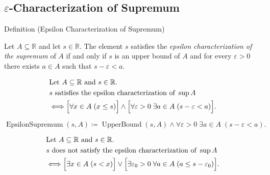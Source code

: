 
\subsection*{$\varepsilon$-Characterization of Supremum}





\begin{definitionbox}{Definition (Epsilon Characterization of Supremum)}
\begin{definition}
\label{def:epsilon-characterization-of-supremum}
Let $A\subseteq\mathbb{R}$ and let $s\in\mathbb{R}$. The element $s$ satisfies the \emph{epsilon characterization of the supremum} of $A$ if and only if $s$ is an upper bound of $A$ and for every $\varepsilon>0$ there exists $a\in A$ such that $s-\varepsilon<a$.
\end{definition}
\end{definitionbox}

\begin{remark*}
\[
\begin{aligned}
&\text{Let } A\subseteq\mathbb{R} \text{ and } s\in\mathbb{R}.\\
&s \text{ satisfies the epsilon characterization of } \sup A\\
&\Longleftrightarrow
\Bigl[\forall x\in A\;(x\le s)\Bigr]
\land
\Bigl[\forall \varepsilon>0\;\exists a\in A\;(s-\varepsilon<a)\Bigr].
\end{aligned}
\]
\end{remark*}

\begin{remark*}
\[
\operatorname{EpsilonSupremum}(s,A)\coloneqq
\operatorname{UpperBound}(s,A)
\land
\forall \varepsilon>0\;\exists a\in A\;(s-\varepsilon<a).
\]
\end{remark*}

\begin{remark*}
\[
\begin{aligned}
&\text{Let } A\subseteq\mathbb{R} \text{ and } s\in\mathbb{R}.\\
&s \text{ does not satisfy the epsilon characterization of } \sup A\\
&\Longleftrightarrow
\Bigl[\exists x\in A\;(s<x)\Bigr]
\lor
\Bigl[\exists \varepsilon_0>0\;\forall a\in A\;(a\le s-\varepsilon_0)\Bigr].
\end{aligned}
\]
\end{remark*}

